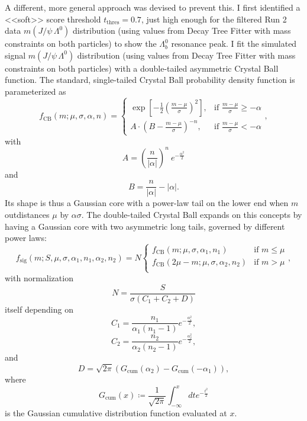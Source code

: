 A different, more general approach was devised to prevent this.
I first identified a <<soft>> score threshold $t_\text{thres} = 0.7$, just high enough for the filtered Run 2 data $m(J/\psi\,\Lambda^0)$ distribution (using values from Decay Tree Fitter with mass constraints on both particles) to show the $\Lambda_b^0$ resonance peak.
I fit the simulated signal $m(J/\psi\,\Lambda^0)$ distribution (using values from Decay Tree Fitter with mass constraints on both particles) with a double-tailed asymmetric Crystal Ball function.
The standard, single-tailed Crystal Ball probability density function is parameterized as
\begin{equation}
	f_\text{CB}(m; \mu, \sigma, \alpha, n) =
	\begin{cases}
		\exp\left[ -\frac{1}{2} {\left(\frac{m-\mu}{\sigma}\right)}^2 \right],
		& \text{if } \frac{m-\mu}{\sigma} \geq -\alpha \\
		A \cdot {\left(B - \frac{m-\mu}{\sigma}\right)}^{-n},
		& \text{if } \frac{m-\mu}{\sigma} < -\alpha
	\end{cases},
	\label{eq:4:crystal_ball}
\end{equation}
with
\begin{equation}
	A = {\left(\frac{n}{|\alpha|}\right)}^n~e^{-\frac{\alpha^2}{2}}
\end{equation}
and
\begin{equation}
	B = \frac{n}{|\alpha|} - |\alpha|.
\end{equation}
Its shape is thus a Gaussian core with a power-law tail on the lower end when $m$ outdistances $\mu$ by $\alpha\sigma$.
The double-tailed Crystal Ball expands on this concepts by having a Gaussian core with two asymmetric long tails, governed by different power laws:
\begin{equation}
	f_\text{sig}
	\left(m; S, \mu, \sigma, \alpha_1, n_1, \alpha_2, n_2 \right) =
	N
	\begin{cases}
	f_\text{CB}(m; \mu, \sigma, \alpha_1, n_1)
	& \text{if } m \leq \mu \\
	f_\text{CB}(2\mu -m; \mu, \sigma, \alpha_2, n_2)
	& \text{if } m > \mu \\
	\end{cases},
\end{equation}
with normalization
\begin{equation}
	N = \frac{S}{\sigma(C_1 + C_2 + D)}
\end{equation}
itself depending on
\begin{equation}
	C_1 = \frac{n_1}{\alpha_1 (n_1-1)} e^{-\frac{\alpha^2_1}{2}},
\end{equation}
\begin{equation}
	C_2 = \frac{n_2}{\alpha_2 (n_2-1)} e^{-\frac{\alpha^2_2}{2}},
\end{equation}
and
\begin{equation}
	D = \sqrt{2\pi} \left(G_\text{cum} (\alpha_2) - G_\text{cum} (- \alpha_1)\right),
\end{equation}
where
\begin{equation}
G_\text{cum}(x) \coloneqq \frac{1}{\sqrt{2\pi}} \int_{-\infty}^x dt e^{-\frac{t^2}{2}}
\end{equation}
is the Gaussian cumulative distribution function evaluated at $x$.

